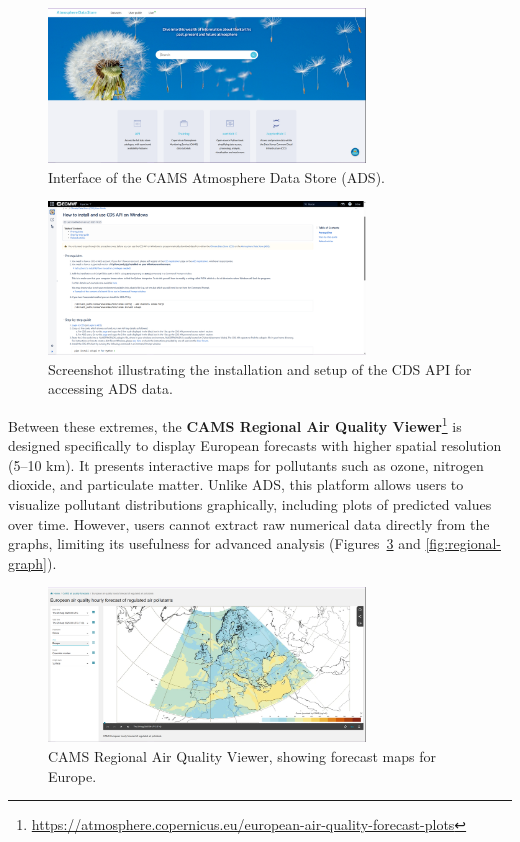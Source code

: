 \begin{figure}[h!btp]
	\centering
	\includegraphics[width=0.75\textwidth]{fig/ads-example.png}
	\caption[CAMS Atmosphere Data Store]{Interface of the CAMS Atmosphere Data Store (ADS).}
	\label{fig:ads}
\end{figure}

\begin{figure}[h!btp]
	\centering
	\includegraphics[width=0.75\textwidth]{fig/ads-example2.png}
	\caption[ADS API setup]{Screenshot illustrating the installation and setup of the CDS API for accessing ADS data.}
	\label{fig:ads2}
\end{figure}

Between these extremes, the \textbf{CAMS Regional Air Quality Viewer}\footnote{\href{https://atmosphere.copernicus.eu/european-air-quality-forecast-plots}{https://atmosphere.copernicus.eu/european-air-quality-forecast-plots}} is designed specifically to display European forecasts with higher spatial resolution (5–10 km). It presents interactive maps for pollutants such as ozone, nitrogen dioxide, and particulate matter. Unlike ADS, this platform allows users to visualize pollutant distributions graphically, including plots of predicted values over time. However, users cannot extract raw numerical data directly from the graphs, limiting its usefulness for advanced analysis (Figures~\ref{fig:regional-map} and \ref{fig:regional-graph}).

\begin{figure}[h!btp]
	\centering
	\includegraphics[width=0.75\textwidth]{fig/regional-example.png}
	\caption[CAMS Regional Viewer - Map]{CAMS Regional Air Quality Viewer, showing forecast maps for Europe.}
	\label{fig:regional-map}
\end{figure}

